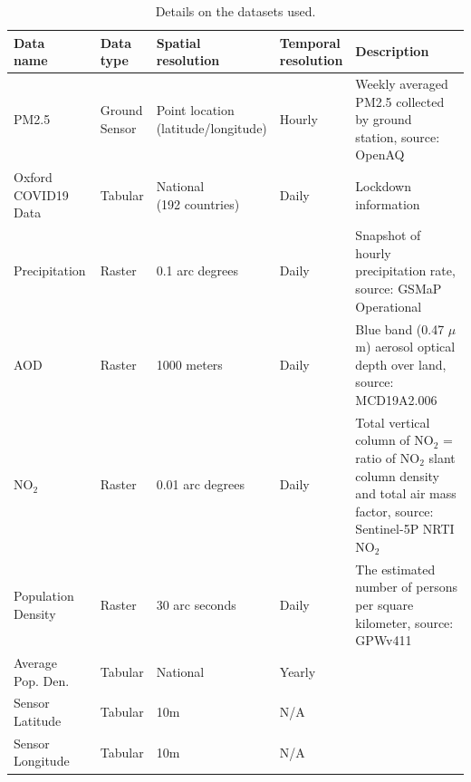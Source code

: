 \begin{table}[t]
\centering
\begin{tabular}{l|llll}
\toprule
\parbox[t]{2cm}{{\bf Data\\name}} &
\parbox[t]{2cm}{{\bf Data\\type}} &
\parbox[t]{3cm}{{\bf Spatial\\resolution}} &
\parbox[t]{2cm}{{\bf Temporal\\resolution}} &
\parbox[t]{5cm}{{\bf Description}}\\\midrule
\parbox[t]{2cm}{PM2.5} &
\parbox[t]{2cm}{Ground\\Sensor} &
\parbox[t]{3cm}{Point location\\(latitude/longitude)} &
\parbox[t]{2cm}{Hourly} &
\parbox[t]{5cm}{Weekly averaged PM2.5 collected by ground station, source: OpenAQ}\\\midrule
\parbox[t]{2cm}{Oxford COVID19 Data} &
\parbox[t]{2cm}{Tabular} &
\parbox[t]{3cm}{National\\(192 countries)} &
\parbox[t]{2cm}{Daily} &
\parbox[t]{5cm}{Lockdown information}\\\midrule
\parbox[t]{2cm}{Precipitation} &
\parbox[t]{2cm}{Raster} &
\parbox[t]{3cm}{0.1 arc degrees} &
\parbox[t]{2cm}{Daily} &
\parbox[t]{5cm}{Snapshot of hourly precipitation rate, source: GSMaP Operational}\\\midrule
\parbox[t]{2cm}{AOD} &
\parbox[t]{2cm}{Raster} &
\parbox[t]{3cm}{1000 meters} &
\parbox[t]{2cm}{Daily} &
\parbox[t]{5cm}{Blue band (0.47 $\mu$m) aerosol optical depth over land, source: MCD19A2.006}\\\midrule
\parbox[t]{2cm}{NO$_2$} &
\parbox[t]{2cm}{Raster} &
\parbox[t]{3cm}{0.01 arc degrees} &
\parbox[t]{2cm}{Daily} &
\parbox[t]{5cm}{Total vertical column of NO$_2$ = ratio of NO$_2$ slant column density and total air mass factor, source: Sentinel-5P NRTI NO$_2$}\\\midrule
\parbox[t]{2cm}{Population Density} &
\parbox[t]{2cm}{Raster} &
\parbox[t]{3cm}{30 arc seconds} &
\parbox[t]{2cm}{Daily} &
\parbox[t]{5cm}{The estimated number of persons per square kilometer, source: GPWv411}\\\midrule
\parbox[t]{2cm}{Average\\Pop. Den.} &
\parbox[t]{2cm}{Tabular} &
\parbox[t]{3cm}{National} &
\parbox[t]{2cm}{Yearly} &
\parbox[t]{5cm}{}\\\midrule
\parbox[t]{2cm}{Sensor\\Latitude} &
\parbox[t]{2cm}{Tabular} &
\parbox[t]{3cm}{10m} &
\parbox[t]{2cm}{N/A} &
\parbox[t]{5cm}{}\\\midrule
\parbox[t]{2cm}{Sensor\\Longitude} &
\parbox[t]{2cm}{Tabular} &
\parbox[t]{3cm}{10m} &
\parbox[t]{2cm}{N/A} &
\parbox[t]{5cm}{}\\\bottomrule
    \end{tabular}
    \caption{Details on the datasets used.}
    \label{tab:datatable}
\end{table}

